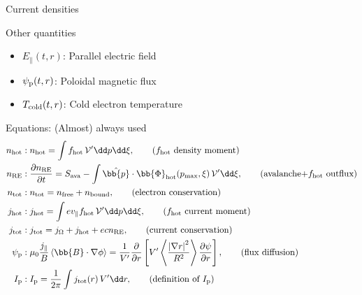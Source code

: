 \documentclass[titleunderline,widescreen1610]{chalmerspresentation}
\newcommand{\Efield}{E_\parallel}
\newcommand{\fhot}{f_{\rm hot}}
\newcommand{\Ip}{I_{\rm p}}
\newcommand{\nhot}{n_{\rm hot}}
\newcommand{\nre}{n_{\rm RE}}
\newcommand{\ntot}{n_{\rm tot}}
\newcommand{\jhot}{j_{\rm hot}}
\newcommand{\johm}{j_{\Omega}}
\newcommand{\jtot}{j_{\rm tot}}
\newcommand{\psip}{\psi_{\rm p}}
\newcommand{\Tcold}{T_{\rm cold}}
\newcommand{\phat}{\hat{\bb{p}}}
\newcommand{\pmax}{p_{\rm max}}
\newcommand{\Vp}{\mathcal{V}'}
\newcommand{\VpVol}{V'}
\begin{document}
\begin{frame}
\begin{minipage}{0.48\textwidth}
\begin{block}{Current densities}
\begin{itemize}
                \end{itemize}
            \end{block}
            \begin{block}{Other quantities}
                \begin{itemize}
                    \item $\Efield(t,r)$: Parallel electric field
                    \item $\psip(t,r)$: Poloidal magnetic flux
                    \item $\Tcold(t,r)$: Cold electron temperature
                \end{itemize}
            \end{block}
        \end{minipage}
    \end{frame}

    \begin{frame}{Equations: (Almost) always used}
        \begin{align}
            \nhot &: \nhot = \int\fhot\,\Vp\dd p\dd\xi, \tag{$\fhot$ density moment}\\
            \nre &: \frac{\partial\nre}{\partial t} = S_{\rm ava} - \int\phat\cdot\bb{\Phi}_{\rm hot}(\pmax, \xi)\,\Vp\dd\xi, \tag{avalanche+$\fhot$ outflux}\\
            \ntot &: \ntot = n_{\rm free} + n_{\rm bound}, \tag{electron conservation}\\
            \jhot &: \jhot = \int ev_\parallel\fhot\,\Vp\dd p\dd\xi, \tag{$\fhot$ current moment}\\
            \jtot &: \jtot = \johm + \jhot + ec\nre, \tag{current conservation}\\
            \psip &: \mu_0\frac{j_\parallel}{B}\left\langle \bb{B}\cdot\nabla\phi \right\rangle =
                \frac{1}{V'}\frac{\partial}{\partial r}\left[
                    V' \left\langle \frac{\left|\nabla r \right|^2}{R^2} \right\rangle
                    \frac{\partial\psi}{\partial r}
                \right], \tag{flux diffusion}\\
            \Ip &: \Ip = \frac{1}{2\pi}\int\jtot(r)\,\VpVol\dd r, \tag{definition of $\Ip$}
        \end{align}
    \end{frame}
\end{document}
